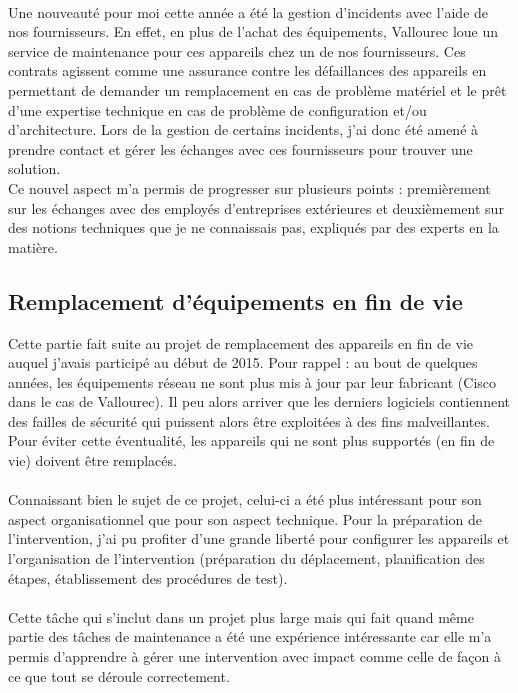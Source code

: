 \documentclass[a4paper,12pt]{report}
\begin{document}
\paragraph{}
Une nouveauté pour moi cette année a été la gestion d'incidents avec l'aide de nos fournisseurs. En effet, en plus de l'achat des équipements, Vallourec loue un service de maintenance pour ces appareils chez un de nos fournisseurs. Ces contrats agissent comme une assurance contre les défaillances des appareils en permettant de demander un remplacement en cas de problème matériel et le prêt d'une expertise technique en cas de problème de configuration et/ou d'architecture. Lors de la gestion de certains incidents, j'ai donc été amené à prendre contact et gérer les échanges avec ces fournisseurs pour trouver une solution.\\
Ce nouvel aspect m'a permis de progresser sur plusieurs points : premièrement sur les échanges avec des employés d'entreprises extérieures et deuxièmement sur des notions techniques que je ne connaissais pas, expliqués par des experts en la matière.

\subsection{Remplacement d'équipements en fin de vie} %
Cette partie fait suite au projet de remplacement des appareils en fin de vie auquel j'avais participé au début de 2015. Pour rappel : au bout de quelques années, les équipements réseau ne sont plus mis à jour par leur fabricant (Cisco dans le cas de Vallourec). Il peu alors arriver que les derniers logiciels contiennent des failles de sécurité qui puissent alors être exploitées à des fins malveillantes. Pour éviter cette éventualité, les appareils qui ne sont plus supportés (en fin de vie) doivent être remplacés.
\paragraph{}
Connaissant bien le sujet de ce projet, celui-ci a été plus intéressant pour son aspect organisationnel que pour son aspect technique. Pour la préparation de l'intervention, j'ai pu profiter d'une grande liberté pour configurer les appareils et l'organisation de l'intervention (préparation du déplacement, planification des étapes, établissement des procédures de test).
\paragraph{}
Cette tâche qui s'inclut dans un projet plus large mais qui fait quand même partie des tâches de maintenance a été une expérience intéressante  car elle m'a permis d'apprendre à gérer une intervention avec impact comme celle de façon à ce que tout se déroule correctement.
\end{document}
